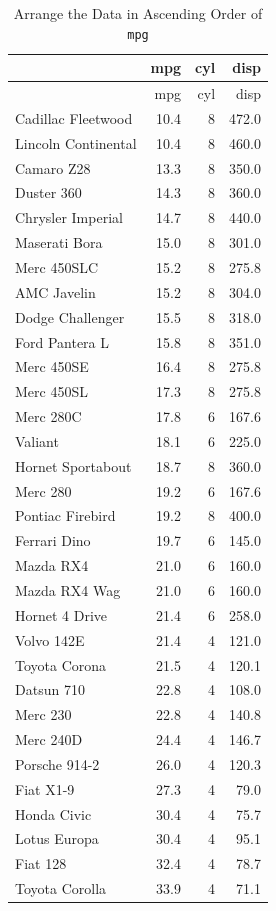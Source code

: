 \documentclass[
  letterpaper,
  paper =a4,
  twoside,
  openright,
  headsepline,
  footsepline,
  listof = totocnumbered,
  chapterprefix = true,
  firstiscover]{scrbook}
\begin{document}
\begin{longtable}[]{@{}lrrr@{}}
\caption{Arrange the Data in Ascending Order of
\texttt{mpg}}\tabularnewline
\toprule\noalign{}
& mpg & cyl & disp \\
\midrule\noalign{}
\endfirsthead
\toprule\noalign{}
& mpg & cyl & disp \\
\midrule\noalign{}
\endhead
\bottomrule\noalign{}
\endlastfoot
Cadillac Fleetwood & 10.4 & 8 & 472.0 \\
Lincoln Continental & 10.4 & 8 & 460.0 \\
Camaro Z28 & 13.3 & 8 & 350.0 \\
Duster 360 & 14.3 & 8 & 360.0 \\
Chrysler Imperial & 14.7 & 8 & 440.0 \\
Maserati Bora & 15.0 & 8 & 301.0 \\
Merc 450SLC & 15.2 & 8 & 275.8 \\
AMC Javelin & 15.2 & 8 & 304.0 \\
Dodge Challenger & 15.5 & 8 & 318.0 \\
Ford Pantera L & 15.8 & 8 & 351.0 \\
Merc 450SE & 16.4 & 8 & 275.8 \\
Merc 450SL & 17.3 & 8 & 275.8 \\
Merc 280C & 17.8 & 6 & 167.6 \\
Valiant & 18.1 & 6 & 225.0 \\
Hornet Sportabout & 18.7 & 8 & 360.0 \\
Merc 280 & 19.2 & 6 & 167.6 \\
Pontiac Firebird & 19.2 & 8 & 400.0 \\
Ferrari Dino & 19.7 & 6 & 145.0 \\
Mazda RX4 & 21.0 & 6 & 160.0 \\
Mazda RX4 Wag & 21.0 & 6 & 160.0 \\
Hornet 4 Drive & 21.4 & 6 & 258.0 \\
Volvo 142E & 21.4 & 4 & 121.0 \\
Toyota Corona & 21.5 & 4 & 120.1 \\
Datsun 710 & 22.8 & 4 & 108.0 \\
Merc 230 & 22.8 & 4 & 140.8 \\
Merc 240D & 24.4 & 4 & 146.7 \\
Porsche 914-2 & 26.0 & 4 & 120.3 \\
Fiat X1-9 & 27.3 & 4 & 79.0 \\
Honda Civic & 30.4 & 4 & 75.7 \\
Lotus Europa & 30.4 & 4 & 95.1 \\
Fiat 128 & 32.4 & 4 & 78.7 \\
Toyota Corolla & 33.9 & 4 & 71.1 \\
\end{longtable}
\end{document}
